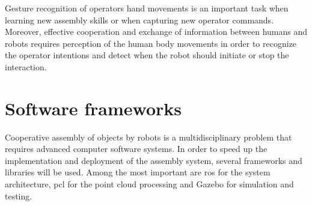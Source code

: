 Gesture recognition of operators hand movements \cite{Gleeson2013} is an important task when learning new assembly skills or when capturing new operator commands. Moreover, effective cooperation and exchange of information between humans and robots requires perception of the human body movements \cite{Roitberg2014} in order to recognize the operator intentions and detect when the robot should initiate or stop the interaction.


%



\section{Software frameworks}

Cooperative assembly of objects by robots is a multidisciplinary problem that requires advanced computer software systems. In order to speed up the implementation and deployment of the assembly system, several frameworks and libraries will be used. Among the most important are \gls{ros} for the system architecture, \gls{pcl} for the point cloud processing and Gazebo for simulation and testing.

